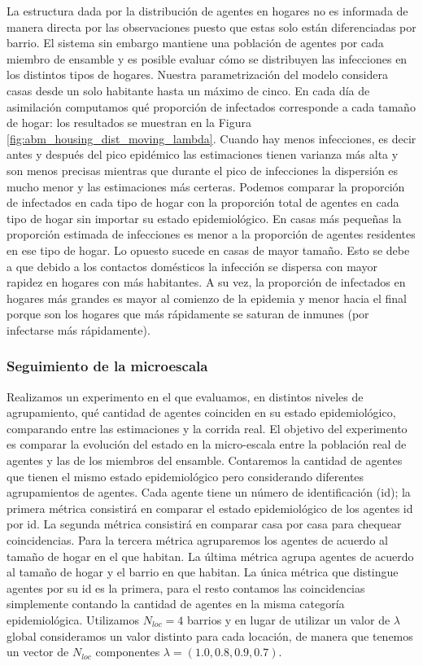 La estructura dada por la distribución de agentes en hogares no es informada de manera directa por las observaciones puesto que estas solo están diferenciadas por barrio. El sistema sin embargo mantiene una población de agentes por cada miembro de ensamble y es posible evaluar cómo se distribuyen las infecciones en los distintos tipos de hogares. Nuestra parametrización del modelo considera casas desde un solo habitante hasta un máximo de cinco. En cada día de asimilación computamos qué proporción de infectados corresponde a cada tamaño de hogar: los resultados se muestran en la Figura \ref{fig:abm_housing_dist_moving_lambda}. Cuando hay menos infecciones, es decir antes y después del pico epidémico las estimaciones tienen varianza más alta y son menos precisas mientras que durante el pico de infecciones la dispersión es mucho menor y las estimaciones más certeras. Podemos comparar la proporción de infectados en cada tipo de hogar con la proporción total de agentes en cada tipo de hogar sin importar su estado epidemiológico. En casas más pequeñas la proporción estimada de infecciones es menor a la proporción de agentes residentes en ese tipo de hogar. Lo opuesto sucede en casas de mayor tamaño. Esto se debe a que debido a los contactos domésticos la infección se dispersa con mayor rapidez en hogares con más habitantes. A su vez, la proporción de infectados en hogares más grandes es mayor al comienzo de la epidemia y menor hacia el final porque son los hogares que más rápidamente se saturan de inmunes (por infectarse más rápidamente).

\subsubsection{Seguimiento de la microescala}

Realizamos un experimento en el que evaluamos, en distintos niveles de agrupamiento, qué cantidad de agentes coinciden en su estado epidemiológico,  comparando entre las estimaciones y la corrida real. El objetivo del experimento es comparar la evolución del estado en la micro-escala entre la población real de agentes y las de los miembros del ensamble. Contaremos la cantidad de agentes que tienen el mismo estado epidemiológico pero considerando diferentes agrupamientos de agentes. Cada agente tiene un número de identificación (id); la primera métrica consistirá en comparar el estado epidemiológico de los agentes id por id. La segunda métrica consistirá en comparar casa por casa para chequear coincidencias. Para la tercera métrica agruparemos los agentes de acuerdo al tamaño de hogar en el que habitan. La última métrica agrupa agentes de acuerdo al tamaño de hogar y el barrio en que habitan. La única métrica que distingue agentes por su id es la primera, para el resto contamos las coincidencias simplemente contando la cantidad de agentes en la misma categoría epidemiológica. Utilizamos $N_{loc} = 4$ barrios y en lugar de utilizar un valor de $\lambda$ global consideramos un valor distinto para cada locación, de manera que tenemos un vector de $N_{loc}$ componentes $\lambda = (1.0, 0.8, 0.9, 0.7)$. 

